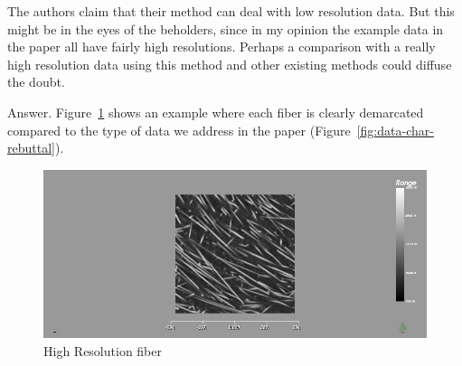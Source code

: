 \documentclass[]{article}
\begin{document}
\color{red}
The authors claim that their method can deal with low resolution data.
But this might be in the eyes of the beholders, since in my opinion the example data in the paper all have fairly high resolutions. Perhaps a comparison with a really high resolution data using this method and other existing methods could diffuse the doubt.
\color{black}

Answer. Figure~\ref{fig:glass_fibers} shows an example where each fiber is clearly demarcated compared to the type of data we address in the paper (Figure~\ref{fig:data-char-rebuttal}).
\begin{figure}
\centering
\includegraphics[width=0.7\linewidth]{images_pvis/glass_fibers}
\caption{High Resolution fiber}
\label{fig:glass_fibers}
\end{figure}
\end{document}
